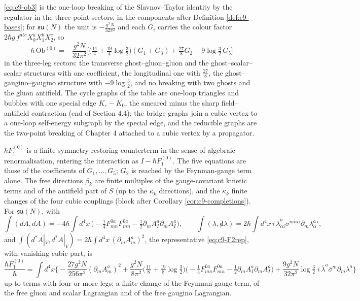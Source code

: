 \begin{remark}
\eqref{eq:c9-ob3} is the one-loop breaking of the Slavnov--Taylor identity by the regulator in the three-point sectors, in the components after Definition \ref{def:c9-bases}; for $\mathfrak{su}(N)$ the unit is $-\frac{g^2N}{32\pi^2}$ and each $G_i$ carries the colour factor $2\hbar g\,f^{abc}X_0^aX_1^bX_2^c$, so
\[
\hbar\,\mathrm{Ob}^{(0)}=-\frac{g^2N}{32\pi^2}\Big[\big(\tfrac{11}4+\tfrac{19}4\log\tfrac32\big)(G_1+G_3)+\tfrac{27}8G_2-9\log\tfrac32\,G_5\Big]
\]
in the three-leg sectors: the transverse ghost--gluon--gluon and the ghost--scalar--scalar structures with one coefficient, the longitudinal one with $\tfrac{27}8$, the ghost--gaugino--gaugino structure with $-9\log\tfrac32$, and no breaking with two ghosts and the gluon antifield. The cycle graphs of the table are one-loop triangles and bubbles with one special edge $K_\varepsilon-K_0$, the smeared minus the sharp field--antifield contraction (end of Section 4.4); the bridge graphs join a cubic vertex to a one-loop self-energy subgraph by the special edge, and the reducible graphs are the two-point breaking of Chapter 4 attached to a cubic vertex by a propagator.
\end{remark}

\begin{remark}
$\hbar F_1^{(0)}$ is a finite symmetry-restoring counterterm in the sense of algebraic renormalisation, entering the interaction as $I-\hbar F_1^{(0)}$. The five equations are those of the coefficients of $G_1,\dots,G_5$; $G_2$ is reached by the Feynman-gauge term alone. The free directions $\beta_k$ are finite multiples of the gauge-covariant kinetic terms and of the antifield part of $S$ (up to the $\kappa_k$ directions), and the $\kappa_k$ finite changes of the four cubic couplings (block after Corollary \ref{cor:c9-completions}). For $\mathfrak{su}(N)$, with
\[
\int(dA,dA)=-4\hbar\int d^4x\,\Big(-\tfrac14F^{0a}_{mn}F^{0a}_{mn}-\tfrac12\partial_mA^a_I\partial_mA^a_I\Big),\qquad \int(\lambda,{\not d}\lambda)=2\hbar\int d^4x\,i\,\bar\lambda^a_{\dot\alpha i}\bar\sigma^{m\dot\alpha\alpha}\partial_m\lambda^a_\alpha{}^i,
\]
and $\int(d^*A|_V,d^*A|_V)=2\hbar\int d^4x\,(\partial_mA^a_m)^2$, the representative \eqref{eq:c9-F2rep}, with vanishing cubic part, is
\[
\frac{\hbar F_1^{(0)}}\hbar=\int d^4x\Big\{-\frac{27g^2N}{256\pi^2}(\partial_mA^a_m)^2+\frac{g^2N}{8\pi^2}\Big(\tfrac{11}8+\tfrac{19}8\log\tfrac32\Big)\Big(-\tfrac14F^{0a}_{mn}F^{0a}_{mn}-\tfrac12\partial_mA^a_I\partial_mA^a_I\Big)+\frac{9g^2N}{32\pi^2}\log\tfrac32\;i\,\bar\lambda^a\bar\sigma^m\partial_m\lambda^a\Big\}
\]
up to terms with four or more legs: a finite change of the Feynman-gauge term, of the free gluon and scalar Lagrangian and of the free gaugino Lagrangian.
\end{remark}

